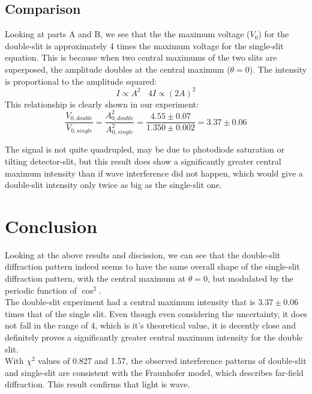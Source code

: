 \documentclass[prb,preprint]{revtex4-1}
\begin{document}
\subsection{Comparison}

Looking at parts A and B, we see that the the maximum voltage ($V_0$) for the double-slit is approximately 4 times the maximum voltage for the single-slit equation. This is because when two central maximums of the two slits are superposed, the amplitude doubles at the central maximum ($\theta = 0$). The intensity is proportional to the amplitude squared: $$I \propto A^2 \ \ \ \	4I \propto(2A)^2$$ This relationship is clearly shown in our experiment: $$\frac{V_{0,double}}{V_{0,single}}=\frac{A_{0,double}^2}{A_{0,single}^2} = \frac{4.55\pm 0.07}{1.350 \pm 0.002}=3.37 \pm 0.06 $$ 

The signal is not quite quadrupled, may be due to photodiode saturation or tilting detector-slit, but this result does show a significantly greater central maximum intensity than if wave interference did not happen, which would give a double-slit intensity only twice as big as the single-slit one. \\




\section{Conclusion}

Looking at the above results and discission, we can see that the double-slit diffraction pattern indeed seems to have the same overall shape of the single-slit diffraction pattern, with the central maximum at $\theta=0$, but modulated by the periodic function of $\cos ^2$. \\

The double-slit experiment had a central maximum intensity that is $3.37\pm0.06$ times that of the single slit. Even though even considering the uncertainty, it does not fall in the range of 4, which is it's theoretical value, it is decently close and definitely proves a significantly greater central maximum intensity for the double slit.\\

With $\chi^2$ values of 0.827 and 1.57, the observed interference patterns of double-slit and single-slit are consistent with the Fraunhofer model, which describes far-field diffraction. This result confirms that light is wave.\\
\end{document}
